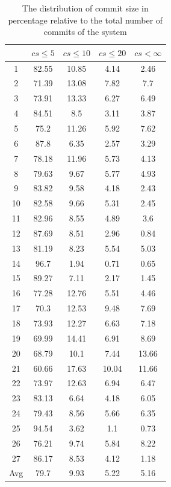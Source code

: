 \documentclass[a4paper,twoside]{article}
\begin{document}
\begin{table}[!h]
\renewcommand{\arraystretch}{1.25}
\caption{The distribution of commit size in percentage relative to the total number of commits of the system }
\label{table:5}
\centering
\begin{tabular}{|c|c|c|c|c|}
\hline
   &	$cs\leq 5$	&	$cs\leq 10$	&	$cs\leq 20$	&	$cs< \infty$	\\
\hline
1	&	82.55	&	10.85	&	4.14	&	2.46	\\
2	&	71.39	&	13.08	&	7.82	&	7.7	\\
3	&	73.91	&	13.33	&	6.27	&	6.49	\\
4	&	84.51	&	8.5	&	3.11	&	3.87	\\
5	&	75.2	&	11.26	&	5.92	&	7.62	\\
6	&	87.8	&	6.35	&	2.57	&	3.29	\\
7	&	78.18	&	11.96	&	5.73	&	4.13	\\
8	&	79.63	&	9.67	&	5.77	&	4.93	\\
9	&	83.82	&	9.58	&	4.18	&	2.43	\\
10	&	82.58	&	9.66	&	5.31	&	2.45	\\
11	&	82.96	&	8.55	&	4.89	&	3.6	\\
12	&	87.69	&	8.51	&	2.96	&	0.84	\\
13	&	81.19	&	8.23	&	5.54	&	5.03	\\
14	&	96.7	&	1.94	&	0.71	&	0.65	\\
15	&	89.27	&	7.11	&	2.17	&	1.45	\\
16	&	77.28	&	12.76	&	5.51	&	4.46	\\
17	&	70.3	&	12.53	&	9.48	&	7.69	\\
18	&	73.93	&	12.27	&	6.63	&	7.18	\\
19	&	69.99	&	14.41	&	6.91	&	8.69	\\
20	&	68.79	&	10.1	&	7.44	&	13.66	\\
21	&	60.66	&	17.63	&	10.04	&	11.66	\\
22	&	73.97	&	12.63	&	6.94	&	6.47	\\
23	&	83.13	&	6.64	&	4.18	&	6.05	\\
24	&	79.43	&	8.56	&	5.66	&	6.35	\\
25	&	94.54	&	3.62	&	1.1	&	0.73	\\
26	&	76.21	&	9.74	&	5.84	&	8.22	\\
27	&	86.17	&	8.53	&	4.12	&	1.18	\\
\hline
Avg	&	79.7	&	9.93	&	5.22	&	5.16	\\
\hline
\end{tabular}
\end{table}
\end{document}
